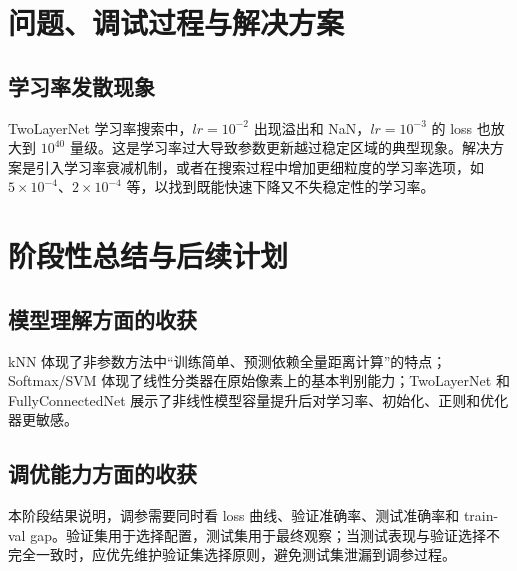 \documentclass[UTF8]{ctexart}
\begin{document}
\section{问题、调试过程与解决方案}

\subsection{学习率发散现象}

TwoLayerNet 学习率搜索中，$lr=10^{-2}$ 出现溢出和 NaN，$lr=10^{-3}$ 的 loss 也放大到 $10^{40}$ 量级。这是学习率过大导致参数更新越过稳定区域的典型现象。解决方案是引入学习率衰减机制，或者在搜索过程中增加更细粒度的学习率选项，如 $5\times10^{-4}$、$2\times10^{-4}$ 等，以找到既能快速下降又不失稳定性的学习率。

\section{阶段性总结与后续计划}

\subsection{模型理解方面的收获}

kNN 体现了非参数方法中“训练简单、预测依赖全量距离计算”的特点；Softmax/SVM 体现了线性分类器在原始像素上的基本判别能力；TwoLayerNet 和 FullyConnectedNet 展示了非线性模型容量提升后对学习率、初始化、正则和优化器更敏感。

\subsection{调优能力方面的收获}

本阶段结果说明，调参需要同时看 loss 曲线、验证准确率、测试准确率和 train-val gap。验证集用于选择配置，测试集用于最终观察；当测试表现与验证选择不完全一致时，应优先维护验证集选择原则，避免测试集泄漏到调参过程。
\end{document}
